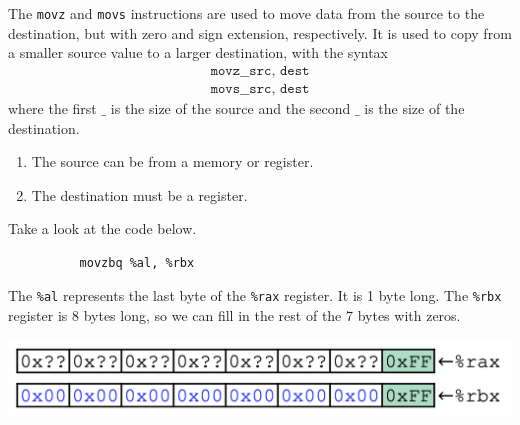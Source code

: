 \documentclass{article}
\begin{document}
      \begin{definition}
        The \texttt{movz} and \texttt{movs} instructions are used to move data from the source to the destination, but with zero and sign extension, respectively. It is used to copy from a smaller source value to a larger destination, with the syntax 
        \begin{align*}
          \texttt{movz\_\_ src, dest} \\ 
          \texttt{movs\_\_ src, dest} 
        \end{align*}
        where the first $\_$ is the size of the source and the second $\_$ is the size of the destination. 
        \begin{enumerate}
          \item The source can be from a memory or register. 
          \item The destination must be a register. 
        \end{enumerate}
      \end{definition}

      \begin{example}
        Take a look at the code below. 
        \begin{lstlisting}
          movzbq %al, %rbx
        \end{lstlisting}
        The \texttt{\%al} represents the last byte of the \texttt{\%rax} register. It is 1 byte long. The \texttt{\%rbx} register is 8 bytes long, so we can fill in the rest of the 7 bytes with zeros. 
        \begin{center}  
          \includegraphics[scale=0.5]{img/movzbq.png}
        \end{center}
      \end{example}
\end{document}
